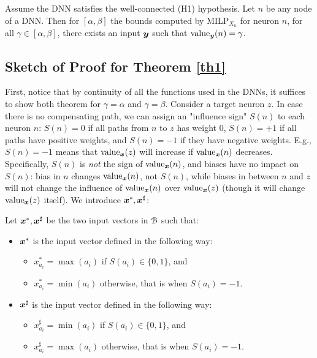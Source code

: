 \begin{theorem}
	\label{th2} 
	Assume the DNN satisfies the well-connected (H1) hypothesis.
	Let $n$ be any node of a DNN. Then for $[\alpha,\beta]$ the bounds computed by MILP$_{X_n}$ for neuron $n$, for all $\gamma \in [\alpha,\beta]$, there exists an input $\boldsymbol{y}$ such that ${\textrm{value}}_{\boldsymbol{y}}(n)=\gamma$.
\end{theorem}


\subsection{Sketch of Proof for Theorem \ref{th1}}
\label{sec.proofs}

First, notice that by continuity of all the functions used in the DNNs, it suffices to show both theorem for $\gamma=\alpha$ and $\gamma=\beta$.
Consider a target neuron $z$.
In case there is no compensating path, we can assign an "influence sign" $S(n)$ to each neuron $n$: $S(n)=0$ if all paths from $n$ to $z$ has weight 0, $S(n)=+1$ if all paths have positive weights, and $S(n)=-1$ if they have negative weights. E.g., $S(n)=-1$ means that ${\textrm{value}}_{\boldsymbol{x}}(z)$ will increase if ${\textrm{value}}_{\boldsymbol{x}}(n)$ decreases. 
Specifically, $S(n)$ is {\em not} the sign of ${\textrm{value}}_{\boldsymbol{x}}(n)$, and biases have no impact on  $S(n)$: bias in $n$ changes ${\textrm{value}}_{\boldsymbol{x}}(n)$, not $S(n)$, while biases in between $n$ and $z$ will not change the influence of ${\textrm{value}}_{\boldsymbol{x}}(n)$ over ${\textrm{value}}_{\boldsymbol{x}}(z)$ (though it will change ${\textrm{value}}_{\boldsymbol{x}}(z)$ itself). We introduce $\boldsymbol{x}^{*}, \boldsymbol{x}^{\sharp}$:

\begin{definition}
Let $\boldsymbol{x}^{*}, \boldsymbol{x}^{\sharp}$ be the two input vectors in $\cal B$ such that: 
	\begin{itemize}
		\item $\boldsymbol{x}^{*}$ is the input vector defined in the following way:
		\begin {itemize}
		 \item $x^*_{a_i}=\max(a_i)$ if $S(a_i)\in \{0,1\}$, and
          \item $x^*_{a_i}=\min(a_i)$ otherwise, that is when $S(a_i)=-1$.
	\end{itemize}
		
		\item $\boldsymbol{x}^{\sharp}$ is the input vector defined in the following way:
		\begin{itemize}
			\item $x^{\sharp}_{a_i}=\min(a_i)$ if $S(a_i)\in \{0,1\}$, and
			\item $x^{\sharp}_{a_i}=\max(a_i)$ otherwise, that is when $S(a_i)=-1$.
		\end{itemize}
	\end{itemize}
\end{definition}


